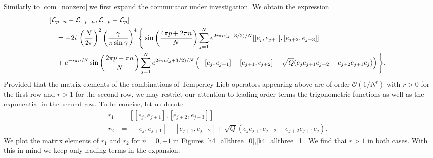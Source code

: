 \documentclass[a4paper,10pt]{article}
\newcommand{\linnea}[1]{$\framebox{\tiny L}$\ \textbf{\texttt{{\color{red}\footnotesize#1}}}}
\newcommand{\KSgen}{\mathcal{L}}
\begin{document}
Similarly to \eqref{com_nonzero} we first expand the commutator under investigation. We obtain the expression 
\begin{equation}\label{com_of_P}
\begin{split}
&[\KSgen_{p+n}-\bar{\KSgen}_{-p-n},\KSgen_{-p}-\bar{\KSgen}_{p}] \\
& \quad = -2i\, \left({N\over2\pi}\right)^2 
\left( \frac{\gamma}{\pi \sin \gamma} \right)^4 \Bigg\{  \sin \left( \frac{4\pi p + 2\pi n}{N} \right) \sum_{j=1}^{N} e^{2i\pi n (j+3/2)/N}
 [[e_j,e_{j+1}],[e_{j+2},e_{j+3}]] \\
& \quad+ e^{- i \pi n /N}  \sin \left( \frac{2\pi p + \pi n}{N} \right) \sum_{j=1}^{N} e^{2i\pi n (j+3/2)/N}
\left( -[e_j,e_{j+1}] - [e_{j+1},e_{j+2}] + \sqrt{Q}(e_je_{j+1}e_{j+2} - e_{j+2}e_{j+1}e_j)  \right)
\Bigg\}.
%
\end{split}
\end{equation}
Provided that the matrix elements of the combinations of Temperley-Lieb operators appearing above are of order $\mathcal{O}(1/N^r)$ with $r>0$ for the first row and $r>1$ for the second row, %
we may restrict our attention to leading order terms the trigonometric functions as well as the exponential in the second row. To be concise, let us denote
\begin{equation}
\begin{split}
r_1& = [[e_j,e_{j+1}],[e_{j+2},e_{j+3}]] \\
r_2 &= -[e_j,e_{j+1}] - [e_{j+1},e_{j+2}] + \sqrt{Q}(e_je_{j+1}e_{j+2} - e_{j+2}e_{j+1}e_j) .
\end{split}
\end{equation} 
We plot the matrix elements of $r_1$ and $r_2$ for $n=0,-1$ in Figures \ref{h4_allthree_0},\ref{h4_allthree_1}.%
 We find that $r>1$ in both cases. With this in mind we keep only leading terms in the expansion: %
\end{document}
